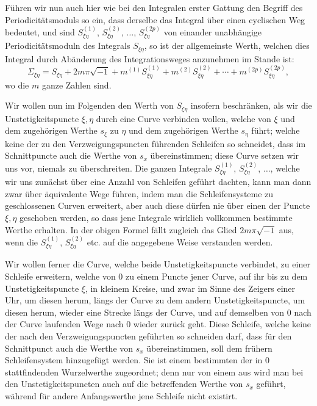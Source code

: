 \documentclass[10pt]{article}
\begin{document}
Führen wir nun auch hier wie bei den Integralen erster Gattung den Begriff des Periodicitätsmoduls so ein, dass derselbe das Integral über einen cyclischen Weg bedeutet, und sind \(S_{\xi\eta}^{(1)}\), \(S_{\xi\eta}^{(2)}\), \(\ldots\), \(S_{\xi\eta}^{(2p)}\) von einander unabhängige Periodicitätsmoduln des Integrals \(S_{\xi\eta}\), so ist der allgemeinste Werth, welchen dies Integral durch Abänderung des Integrationsweges anzunehmen im Stande ist:
\[
\Sigma_{\xi\eta}=S_{\xi\eta}+2m\pi\sqrt{-1}+m^{(1)}S_{\xi\eta}^{(1)}+m^{(2)}S_{\xi\eta}^{(2)}+\cdots+m^{(2p)}S_{\xi\eta}^{(2p)},
\]
wo die \(m\) ganze Zahlen sind.

Wir wollen nun im Folgenden den Werth von \(S_{\xi\eta}\) insofern beschränken, als wir die Unstetigkeitspuncte \(\xi,\eta\) durch eine Curve verbinden wollen, welche von \(\xi\) und dem zugehörigen Werthe \(s_{\xi}\) zu \(\eta\) und dem zugehörigen Werthe \(s_{\eta}\) führt; welche keine der zu den Verzweigungspuncten führenden Schleifen so schneidet, dass im Schnittpuncte auch die Werthe von \(s_x\) übereinstimmen; diese Curve setzen wir uns vor, niemals zu überschreiten. Die ganzen Integrale \(S_{\xi\eta}^{(1)}\), \(S_{\xi\eta}^{(2)}\), \(\ldots\), welche wir uns zunächst über eine Anzahl von Schleifen geführt dachten, kann man dann zwar über äquivalente Wege führen, indem man die Schleifensysteme zu geschlossenen Curven erweitert, aber auch diese dürfen nie über einen der Puncte \(\xi,\eta\) geschoben werden, so dass jene Integrale wirklich vollkommen bestimmte Werthe erhalten. In der obigen Formel fällt zugleich das Glied \(2m\pi\sqrt{-1}\) aus, wenn die \(S_{\xi\eta}^{(1)}\), \(S_{\xi\eta}^{(2)}\) etc. auf die angegebene Weise verstanden werden.

Wir wollen ferner die Curve, welche beide Unstetigkeitspuncte verbindet, zu einer Schleife erweitern, welche von \(0\) zu einem Puncte jener Curve, auf ihr bis zu dem Unstetigkeitspuncte \(\xi\), in kleinem Kreise, und zwar im Sinne des Zeigers einer Uhr, um diesen herum, längs der Curve zu dem andern Unstetigkeitspuncte, um diesen herum, wieder eine Strecke längs der Curve, und auf demselben von \(0\) nach der Curve laufenden Wege nach \(0\) wieder zurück geht. Diese Schleife, welche keine der nach den Verzweigungspuncten geführten so schneiden darf, dass für den Schnittpunct auch die Werthe von \(s_x\) übereinstimmen, soll dem frühern Schleifensystem hinzugefügt werden. Sie ist einem bestimmten der in \(0\) stattfindenden Wurzelwerthe zugeordnet; denn nur von einem aus wird man bei den Unstetigkeitspuncten auch auf die betreffenden Werthe von \(s_x\) geführt, während für andere Anfangswerthe jene Schleife nicht existirt.
\end{document}
